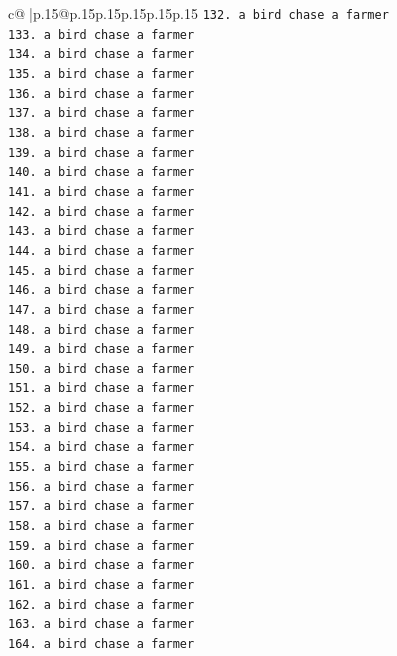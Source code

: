 \documentclass{article}
\begin{document}
{\begin{supertabular}{c@{$\;$}|p{.15\linewidth}@{}p{.15\linewidth}p{.15\linewidth}p{.15\linewidth}p{.15\linewidth}p{.15\linewidth}}
{{{\texttt{132. a bird chase a farmer} \\
\texttt{133. a bird chase a farmer} \\
\texttt{134. a bird chase a farmer} \\
\texttt{135. a bird chase a farmer} \\
\texttt{136. a bird chase a farmer} \\
\texttt{137. a bird chase a farmer} \\
\texttt{138. a bird chase a farmer} \\
\texttt{139. a bird chase a farmer} \\
\texttt{140. a bird chase a farmer} \\
\texttt{141. a bird chase a farmer} \\
\texttt{142. a bird chase a farmer} \\
\texttt{143. a bird chase a farmer} \\
\texttt{144. a bird chase a farmer} \\
\texttt{145. a bird chase a farmer} \\
\texttt{146. a bird chase a farmer} \\
\texttt{147. a bird chase a farmer} \\
\texttt{148. a bird chase a farmer} \\
\texttt{149. a bird chase a farmer} \\
\texttt{150. a bird chase a farmer} \\
\texttt{151. a bird chase a farmer} \\
\texttt{152. a bird chase a farmer} \\
\texttt{153. a bird chase a farmer} \\
\texttt{154. a bird chase a farmer} \\
\texttt{155. a bird chase a farmer} \\
\texttt{156. a bird chase a farmer} \\
\texttt{157. a bird chase a farmer} \\
\texttt{158. a bird chase a farmer} \\
\texttt{159. a bird chase a farmer} \\
\texttt{160. a bird chase a farmer} \\
\texttt{161. a bird chase a farmer} \\
\texttt{162. a bird chase a farmer} \\
\texttt{163. a bird chase a farmer} \\
\texttt{164. a bird chase a farmer} \\
}}}
\end{supertabular}}
\end{document}
